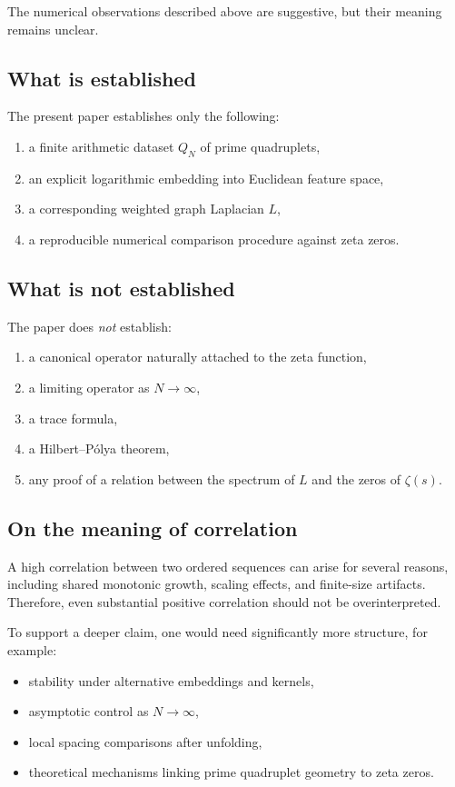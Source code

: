 \documentclass[11pt,a4paper]{article}
\begin{document}
	The numerical observations described above are suggestive, but their meaning remains unclear.
	
	\subsection{What is established}
	
	The present paper establishes only the following:
	\begin{enumerate}[label=(\alph*)]
		\item a finite arithmetic dataset \(Q_N\) of prime quadruplets,
		\item an explicit logarithmic embedding into Euclidean feature space,
		\item a corresponding weighted graph Laplacian \(L\),
		\item a reproducible numerical comparison procedure against zeta zeros.
	\end{enumerate}
	
	\subsection{What is not established}
	
	The paper does \emph{not} establish:
	\begin{enumerate}[label=(\alph*)]
		\item a canonical operator naturally attached to the zeta function,
		\item a limiting operator as \(N\to\infty\),
		\item a trace formula,
		\item a Hilbert--P\'olya theorem,
		\item any proof of a relation between the spectrum of \(L\) and the zeros of \(\zeta(s)\).
	\end{enumerate}
	
	\subsection{On the meaning of correlation}
	
	A high correlation between two ordered sequences can arise for several reasons, including shared monotonic growth, scaling effects, and finite-size artifacts. Therefore, even substantial positive correlation should not be overinterpreted.
	
	To support a deeper claim, one would need significantly more structure, for example:
	\begin{itemize}
		\item stability under alternative embeddings and kernels,
		\item asymptotic control as \(N\to\infty\),
		\item local spacing comparisons after unfolding,
		\item theoretical mechanisms linking prime quadruplet geometry to zeta zeros.
	\end{itemize}
	
\end{document}
